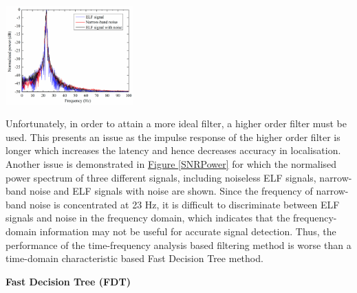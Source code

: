 \documentclass[11pt]{article}		%
\newcommand{\figref}[1]{\hyperref[#1]{Figure \ref*{#1}}}    %
\begin{document}
			\begin{floatingfigure}[r]{0.4\textwidth}
				\centering
				\includegraphics[width=0.37\textwidth]{SNRPower}
				\caption{Normalised power spectrum when SNR is 0 dB and speed is 15 m/s}
				\label{SNRPower}
			\end{floatingfigure}
            \hspace*{2ex}Unfortunately, in order to attain a more ideal filter, a higher order filter must be used.
			This presents an issue as the impulse response of the higher order filter is longer which increases the latency and hence decreases accuracy in localisation. 
			Another issue is demonstrated in \figref{SNRPower} for which the normalised power spectrum of three different signals, including noiseless ELF signals, narrow-band noise and ELF signals with noise are shown. 
			Since the frequency of narrow-band noise is concentrated at 23 Hz, it is difficult to discriminate between ELF signals and noise in the frequency domain, which indicates that the frequency-domain information may not be useful for accurate signal detection. 
			Thus, the performance of the time-frequency analysis based filtering method is worse than a time-domain characteristic based Fast Decision Tree method.
	
		    \textbf{Fast Decision Tree (FDT)}
		    
\end{document}
